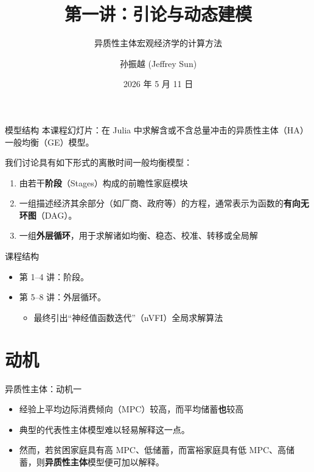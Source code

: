 \documentclass[10pt,aspectratio=169]{beamer}
\title{第一讲：引论与动态建模}
\subtitle{异质性主体宏观经济学的计算方法}
\author{孙振越 (Jeffrey Sun)}
\institute{多伦多大学}
\date{2026 年 5 月 11 日}
\begin{document}
\maketitle

\begin{frame}{模型结构}
  本课程幻灯片：在 Julia 中求解含或不含总量冲击的异质性主体（HA）一般均衡（GE）模型。

  我们讨论具有如下形式的离散时间一般均衡模型：
  \begin{enumerate}
    \item 由若干\textbf{阶段}（Stages）构成的前瞻性家庭模块
    \item 一组描述经济其余部分（如厂商、政府等）的方程，通常表示为函数的\textbf{有向无环图}（DAG）。
    \item 一组\textbf{外层循环}，用于求解诸如均衡、稳态、校准、转移或全局解
  \end{enumerate}
\end{frame}

\begin{frame}{课程结构}
  \begin{itemize}
    \item 第 1--4 讲：阶段。
    \item 第 5--8 讲：外层循环。
    \begin{itemize}
      \item 最终引出“神经值函数迭代”（nVFI）全局求解算法
    \end{itemize}
  \end{itemize}
\end{frame}

\section{动机}

\begin{frame}{异质性主体：动机一}
  \begin{itemize}
    \item 经验上平均边际消费倾向（MPC）较高，而平均储蓄\textbf{也}较高
    \item 典型的代表性主体模型难以轻易解释这一点。
    \item 然而，若贫困家庭具有高 MPC、低储蓄，而富裕家庭具有低 MPC、高储蓄，则\textbf{异质性主体}模型便可加以解释。
  \end{itemize}
\end{frame}
\end{document}
